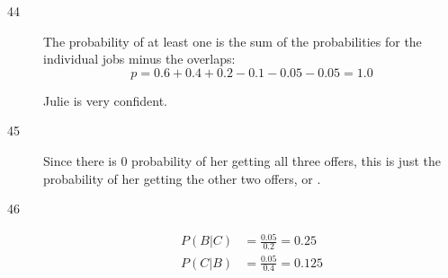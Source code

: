 \documentclass[letterpaper]{exam}
\begin{document}
\begin{description}


    \item[44]
      The probability of at least one is the sum of the probabilities for the individual
      jobs minus the overlaps:
        \[
          p = 0.6 + 0.4 + 0.2 - 0.1 - 0.05 - 0.05 = \boxed{ 1.0 }
        \]

        Julie is very confident.

    \item[45]
      Since there is 0 probability of her getting all three offers, this is just the
      probability of her getting the other two offers, or .

    \item[46]
      \begin{align*}
        P(B|C) &= \frac{0.05}{0.2} = \boxed{ 0.25 } \\
        P(C|B) &= \frac{0.05}{0.4} = \boxed{ 0.125 } \\
      \end{align*}








\end{description}
\end{document}
